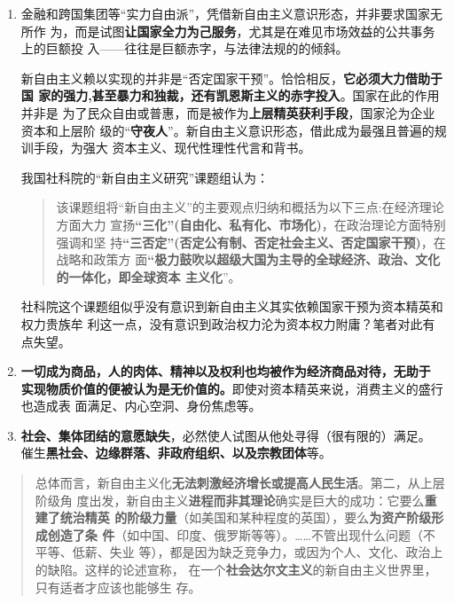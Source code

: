 \begin{enumerate}
\item 金融和跨国集团等“实力自由派”，凭借新自由主义意识形态，并非要求国家无所作
  为，而是试图\textbf{让国家全力为己服务}，尤其是在难见市场效益的公共事务上的巨额投
  入——往往是巨额赤字，与法律法规的的倾斜。

  新自由主义赖以实现的并非是“否定国家干预”。恰恰相反，\textbf{它必须大力借助于国
    家的强力,甚至暴力和独裁，还有凯恩斯主义的赤字投入}。国家在此的作用并非是
  为了民众自由或普惠，而是被作为\textbf{上层精英获利手段}，国家沦为企业资本和上层阶
  级的“\textbf{守夜人}”。新自由主义意识形态，借此成为最强且普遍的规训手段，为强大
  资本主义、现代性理性代言和背书。

  我国社科院的“新自由主义研究”课题组认为：
  \begin{quotation}
    该课题组将“新自由主义”的主要观点归纳和概括为以下三点:在经济理论方面大力
    宣扬\textbf{“三化”(自由化、私有化、市场化)}，在政治理论方面特别强调和坚
    持\textbf{“三否定”(否定公有制、否定社会主义、否定国家干预)}，在战略和政策方
    面\textbf{“极力鼓吹以超级大国为主导的全球经济、政治、文化的一体化，即全球资本
      主义化}”。\cite{newneo}
  \end{quotation}
  社科院这个课题组似乎没有意识到新自由主义其实依赖国家干预为资本精英和权力贵族牟
  利这一点，没有意识到政治权力沦为资本权力附庸？笔者对此有点失望。

\item \textbf{一切成为商品，人的肉体、精神以及权利也均被作为经济商品对待，无助于
    实现物质价值的便被认为是无价值的。}即使对资本精英来说，消费主义的盛行也造成表
  面满足、内心空洞、身份焦虑等。\cite[179]{davidneoliber}

\item \textbf{社会、集体团结的意愿缺失}，必然使人试图从他处寻得（很有限的）满足。
  催生\textbf{黑社会、边缘群落、非政府组织、以及宗教团体}等。
\end{enumerate}

\begin{quotation}
  总体而言，新自由主义化\textbf{无法刺激经济增长或提高人民生活}。第二，从上层阶级角
  度出发，新自由主义\textbf{进程而非其理论}确实是巨大的成功：它要么\textbf{重建了统治精英
    的阶级力量}（如美国和某种程度的英国），要么\textbf{为资产阶级形成创造了条
    件}（如中国、印度、俄罗斯等等）。……不管出现什么问题（不平等、低薪、失业
  等），都是因为缺乏竞争力，或因为个人、文化、政治上的缺陷。这样的论述宣称，
  在一个\textbf{社会达尔文主义}的新自由主义世界里，只有适者才应该也能够生
  存。\cite[164]{davidneoliber}
\end{quotation}

